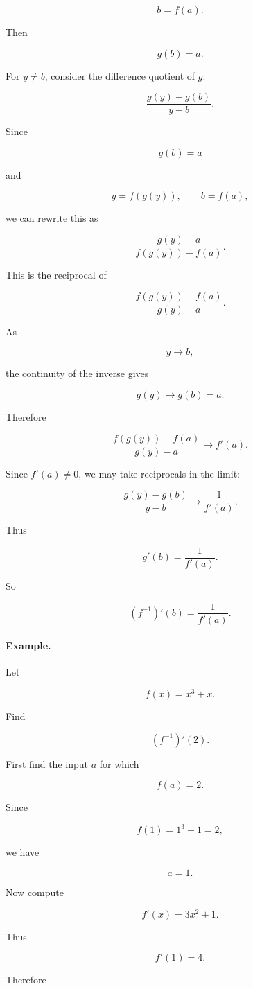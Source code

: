 \[
b=f(a).
\]

Then

\[
g(b)=a.
\]

For \(y\neq b\), consider the difference quotient of \(g\):

\[
\frac{g(y)-g(b)}{y-b}.
\]

Since

\[
g(b)=a
\]

and

\[
y=f(g(y)),
\qquad
b=f(a),
\]

we can rewrite this as

\[
\frac{g(y)-a}{f(g(y))-f(a)}.
\]

This is the reciprocal of

\[
\frac{f(g(y))-f(a)}{g(y)-a}.
\]

As

\[
y\to b,
\]

the continuity of the inverse gives

\[
g(y)\to g(b)=a.
\]

Therefore

\[
\frac{f(g(y))-f(a)}{g(y)-a}\to f'(a).
\]

Since \(f'(a)\neq0\), we may take reciprocals in the limit:

\[
\frac{g(y)-g(b)}{y-b}\to \frac1{f'(a)}.
\]

Thus

\[
g'(b)=\frac1{f'(a)}.
\]

So

\[
\boxed{
(f^{-1})'(b)=\frac1{f'(a)}.
}
\]

\paragraph{Example.}
Let

\[
f(x)=x^3+x.
\]

Find

\[
(f^{-1})'(2).
\]

First find the input \(a\) for which

\[
f(a)=2.
\]

Since

\[
f(1)=1^3+1=2,
\]

we have

\[
a=1.
\]

Now compute

\[
f'(x)=3x^2+1.
\]

Thus

\[
f'(1)=4.
\]

Therefore

